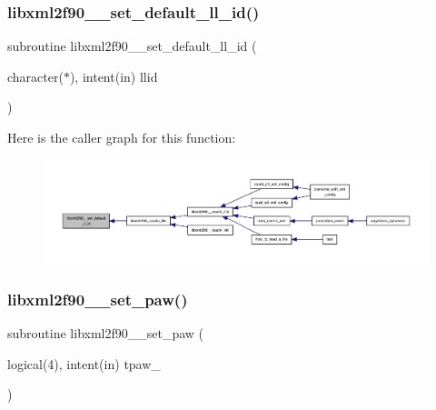 \subsubsection{\texorpdfstring{libxml2f90\+\_\+\+\_\+set\+\_\+default\+\_\+ll\+\_\+id()}{libxml2f90\_\_set\_default\_ll\_id()}}
{\footnotesize\ttfamily subroutine libxml2f90\+\_\+\+\_\+set\+\_\+default\+\_\+ll\+\_\+id (\begin{DoxyParamCaption}\item[{character($\ast$), intent(in)}]{llid }\end{DoxyParamCaption})}

Here is the caller graph for this function\+:
\nopagebreak
\begin{figure}[H]
\begin{center}
\leavevmode
\includegraphics[width=350pt]{libxml2f90_8f90__pp_8f90_ab64e354c556b4f4e6f258a7573b3fb95_icgraph}
\end{center}
\end{figure}
\mbox{\label{libxml2f90_8f90__pp_8f90_ac3295351747cc53a1b37a87e4f99449d}} 
\subsubsection{\texorpdfstring{libxml2f90\+\_\+\+\_\+set\+\_\+paw()}{libxml2f90\_\_set\_paw()}}
{\footnotesize\ttfamily subroutine libxml2f90\+\_\+\+\_\+set\+\_\+paw (\begin{DoxyParamCaption}\item[{logical(4), intent(in)}]{tpaw\+\_\+ }\end{DoxyParamCaption})}

